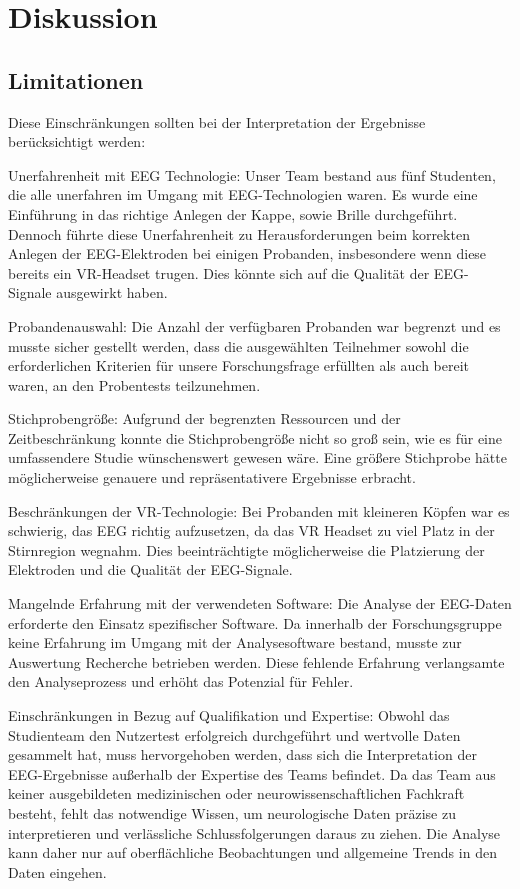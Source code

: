 \documentclass[conference]{IEEEtran}
\begin{document}
\section{Diskussion}
\subsection{Limitationen}
Diese Einschränkungen sollten bei der Interpretation der Ergebnisse berücksichtigt werden:

\begin{myitemize}
	\item Unerfahrenheit mit EEG Technologie: Unser Team bestand aus fünf Studenten, die alle unerfahren im Umgang mit EEG-Technologien waren. Es wurde eine Einführung in das richtige Anlegen der Kappe, sowie Brille durchgeführt. Dennoch führte diese Unerfahrenheit zu Herausforderungen beim korrekten Anlegen der EEG-Elektroden bei einigen Probanden, insbesondere wenn diese bereits ein VR-Headset trugen. Dies könnte sich auf die Qualität der EEG-Signale ausgewirkt haben.
	\item Probandenauswahl: Die Anzahl der verfügbaren Probanden war begrenzt und es musste sicher gestellt werden, dass die ausgewählten Teilnehmer sowohl die erforderlichen Kriterien für unsere Forschungsfrage erfüllten als auch bereit waren, an den Probentests teilzunehmen.
	\item Stichprobengröße: Aufgrund der begrenzten Ressourcen und der Zeitbeschränkung konnte die Stichprobengröße nicht so groß sein, wie es für eine umfassendere Studie wünschenswert gewesen wäre. Eine größere Stichprobe hätte möglicherweise genauere und repräsentativere Ergebnisse erbracht.
	\item Beschränkungen der VR-Technologie: Bei Probanden mit kleineren Köpfen war es schwierig, das EEG richtig aufzusetzen, da das VR Headset zu viel Platz in der Stirnregion wegnahm. Dies beeinträchtigte möglicherweise die Platzierung der Elektroden und die Qualität der EEG-Signale.
	\item Mangelnde Erfahrung mit der verwendeten Software: Die Analyse der EEG-Daten erforderte den Einsatz spezifischer Software. Da innerhalb der Forschungsgruppe keine Erfahrung im Umgang mit der Analysesoftware bestand, musste zur Auswertung Recherche betrieben werden. Diese fehlende Erfahrung verlangsamte den Analyseprozess und erhöht das Potenzial für Fehler.
    \item Einschränkungen in Bezug auf Qualifikation und Expertise:
    Obwohl das Studienteam den Nutzertest erfolgreich durchgeführt und wertvolle Daten gesammelt hat, muss hervorgehoben werden, dass sich die Interpretation der EEG-Ergebnisse außerhalb der Expertise des Teams befindet. Da das Team aus keiner ausgebildeten medizinischen oder neurowissenschaftlichen Fachkraft besteht, fehlt das notwendige Wissen, um neurologische Daten präzise zu interpretieren und verlässliche Schlussfolgerungen daraus zu ziehen. Die Analyse kann daher nur auf oberflächliche Beobachtungen und allgemeine Trends in den Daten eingehen.


\end{myitemize}
\end{document}
